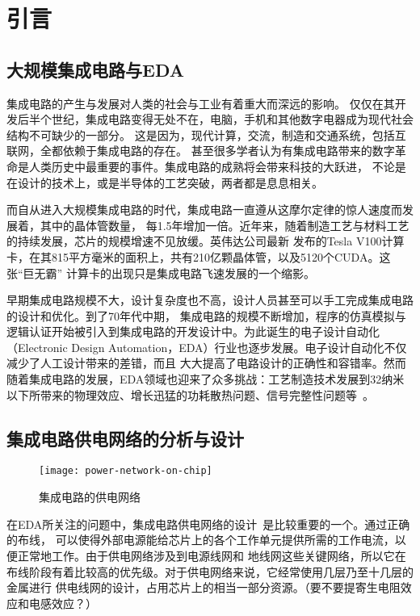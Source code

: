 \chapter{引言}
\label{cha:intro}

\section{大规模集成电路与EDA}

集成电路的产生与发展对人类的社会与工业有着重大而深远的影响。
仅仅在其开发后半个世纪，集成电路变得无处不在，电脑，手机和其他数字电器成为现代社会结构不可缺少的一部分。
这是因为，现代计算，交流，制造和交通系统，包括互联网，全都依赖于集成电路的存在。
甚至很多学者认为有集成电路带来的数字革命是人类历史中最重要的事件。集成电路的成熟将会带来科技的大跃进，
不论是在设计的技术上，或是半导体的工艺突破，两者都是息息相关。

而自从进入大规模集成电路的时代，集成电路一直遵从这摩尔定律的惊人速度而发展着，其中的晶体管数量，
每1.5年增加一倍。近年来，随着制造工艺与材料工艺的持续发展，芯片的规模增速不见放缓。英伟达公司最新
发布的Tesla V100计算卡，在其815平方毫米的面积上，共有210亿颗晶体管，以及5120个CUDA。这张“巨无霸”
计算卡的出现只是集成电路飞速发展的一个缩影。

早期集成电路规模不大，设计复杂度也不高，设计人员甚至可以手工完成集成电路的设计和优化。到了70年代中期，
集成电路的规模不断增加，程序的仿真模拟与逻辑认证开始被引入到集成电路的开发设计中。为此诞生的电子设计自动化
（Electronic Design Automation，EDA）行业也逐步发展。电子设计自动化不仅减少了人工设计带来的差错，而且
大大提高了电路设计的正确性和容错率。然而随着集成电路的发展，EDA领域也迎来了众多挑战：工艺制造技术发展到32纳米
以下所带来的物理效应、增长迅猛的功耗散热问题、信号完整性问题等~\cite{shang2004thermal, swaminathan2010designing}。

\section{集成电路供电网络的分析与设计}

\begin{figure}[H] %
  \centering
  \texttt{[image: power-network-on-chip]}
  \caption{集成电路的供电网络}
  \label{fig:figpower}
\end{figure}

在EDA所关注的问题中，集成电路供电网络的设计~\cite{zhu2004power}是比较重要的一个。通过正确的布线，
可以使得外部电源能给芯片上的各个工作单元提供所需的工作电流，以便正常地工作。由于供电网络涉及到电源线网和
地线网这些关键网络，所以它在布线阶段有着比较高的优先级。对于供电网络来说，它经常使用几层乃至十几层的金属进行
供电线网的设计，占用芯片上的相当一部分资源。（要不要提寄生电阻效应和电感效应？）

